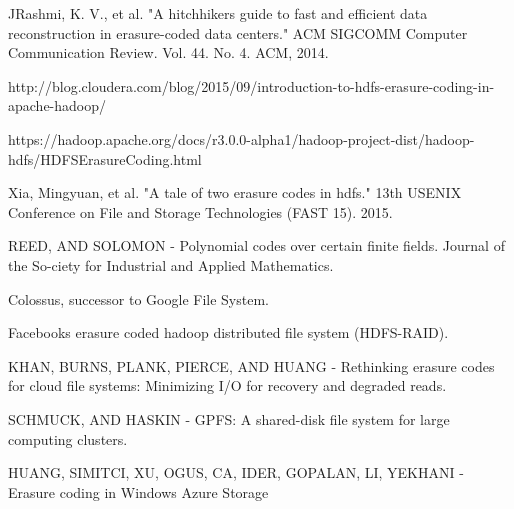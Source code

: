 \documentclass{sig-alternate-05-2015}
\begin{document}
  \begin{thebibliography}{1}

   JRashmi, K. V., et al. "A hitchhiker\textquotesingle s guide to fast and efficient data reconstruction in erasure-coded data centers." ACM SIGCOMM Computer Communication Review. Vol. 44. No. 4. ACM, 2014.

    http://blog.cloudera.com/blog/2015/09/introduction-to-hdfs-erasure-coding-in-apache-hadoop/
  
   https://hadoop.apache.org/docs/r3.0.0-alpha1/hadoop-project-dist/hadoop-hdfs/HDFSErasureCoding.html

  Xia, Mingyuan, et al. "A tale of two erasure codes in hdfs." 13th USENIX Conference on File and Storage Technologies (FAST 15). 2015.
  
   REED, AND SOLOMON - Polynomial codes over certain finite fields. Journal of the So-ciety for Industrial and Applied Mathematics.
  
   Colossus, successor to Google File System.
  
   Facebook\textquotesingle s erasure coded hadoop distributed file system (HDFS-RAID). 
  
   KHAN, BURNS, PLANK, PIERCE, AND HUANG - Rethinking erasure codes for
cloud file systems: Minimizing I/O for recovery and degraded reads.

   SCHMUCK, AND HASKIN - GPFS: A shared-disk file system for large computing clusters. 
  
   HUANG, SIMITCI, XU, OGUS, CA, IDER, GOPALAN, LI, YEKHANI - Erasure coding in Windows Azure Storage

  \end{thebibliography}
\end{document}
